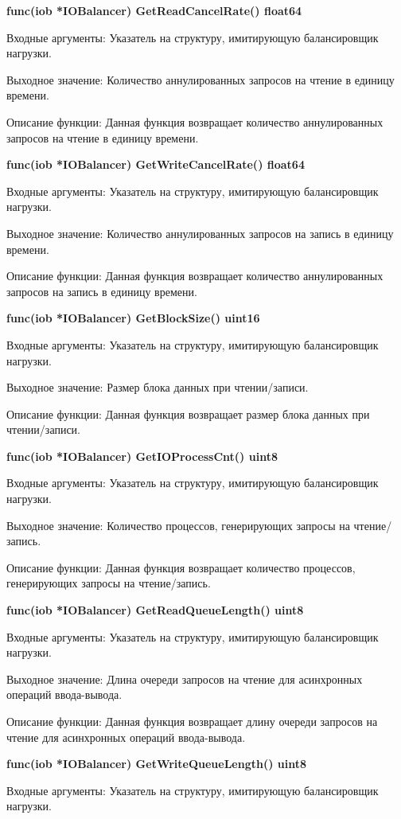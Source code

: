 \textbf{func(iob *IOBalancer) GetReadCancelRate() float64}

Входные аргументы: Указатель на структуру, имитирующую балансировщик нагрузки.

Выходное значение: Количество аннулированных запросов на чтение в единицу времени.

Описание функции: Данная функция возвращает количество аннулированных запросов на чтение в единицу времени.

\textbf{func(iob *IOBalancer) GetWriteCancelRate() float64}

Входные аргументы: Указатель на структуру, имитирующую балансировщик нагрузки.

Выходное значение: Количество аннулированных запросов на запись в единицу времени. 

Описание функции: Данная функция возвращает количество аннулированных запросов на запись в единицу времени.

\textbf{func(iob *IOBalancer) GetBlockSize() uint16}

Входные аргументы: Указатель на структуру, имитирующую балансировщик нагрузки.

Выходное значение:  Размер блока данных при чтении/записи.

Описание функции: Данная функция возвращает  размер блока данных при чтении/записи.

\textbf{func(iob *IOBalancer) GetIOProcessCnt() uint8}

Входные аргументы: Указатель на структуру, имитирующую балансировщик нагрузки.

Выходное значение: Количество процессов, генерирующих запросы на чтение/запись.

Описание функции: Данная функция возвращает количество процессов, генерирующих запросы на чтение/запись.

\textbf{func(iob *IOBalancer) GetReadQueueLength() uint8}

Входные аргументы: Указатель на структуру, имитирующую балансировщик нагрузки.

Выходное значение: Длина очереди запросов на чтение для асинхронных операций ввода-вывода.

Описание функции: Данная функция возвращает длину очереди запросов на чтение для асинхронных операций ввода-вывода.

\textbf{func(iob *IOBalancer) GetWriteQueueLength() uint8}

Входные аргументы: Указатель на структуру, имитирующую балансировщик нагрузки.


